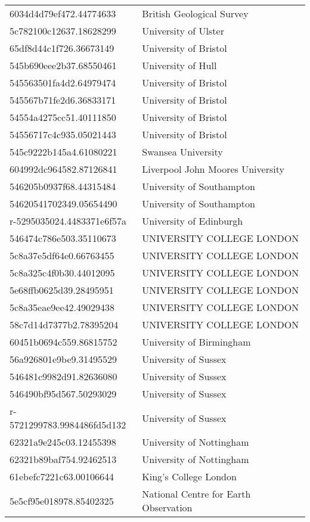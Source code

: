 \begin{tabular}{ll}
6034d4d79ef472.44774633 & British Geological Survey \\
5c782100c12637.18628299 & University of Ulster \\
65df8d44c1f726.36673149 & University of Bristol \\
545b690eee2b37.68550461 & University of Hull \\
545563501fa4d2.64979474 & University of Bristol \\
545567b71fe2d6.36833171 & University of Bristol \\
54554a4275cc51.40111850 & University of Bristol \\
54556717c4c935.05021443 & University of Bristol \\
545c9222b145a4.61080221 & Swansea University \\
604992dc964582.87126841 & Liverpool John Moores University \\
546205b0937f68.44315484 & University of Southampton \\
54620541702349.05654490 & University of Southampton \\
r-5295035024.4483371e6f57a & University of Edinburgh \\
546474c786e503.35110673 & UNIVERSITY COLLEGE LONDON \\
5c8a37e5df64e0.66763455 & UNIVERSITY COLLEGE LONDON \\
5c8a325c4f0b30.44012095 & UNIVERSITY COLLEGE LONDON \\
5e68ffb0625d39.28495951 & UNIVERSITY COLLEGE LONDON \\
5c8a35eae9ee42.49029438 & UNIVERSITY COLLEGE LONDON \\
58c7d14d7377b2.78395204 & UNIVERSITY COLLEGE LONDON \\
60451b0694c559.86815752 & University of Birmingham \\
56a926801e9be9.31495529 & University of Sussex \\
546481c9982d91.82636080 & University of Sussex \\
546490bf95d567.50293029 & University of Sussex \\
r-5721299783.9984486fd5d132 & University of Sussex \\
62321a9e245c03.12455398 & University of Nottingham \\
62321b89baf754.92462513 & University of Nottingham \\
61ebefc7221c63.00106644 & King's College London \\
5e5cf95e018978.85402325 & National Centre for Earth Observation \\

\end{tabular}
